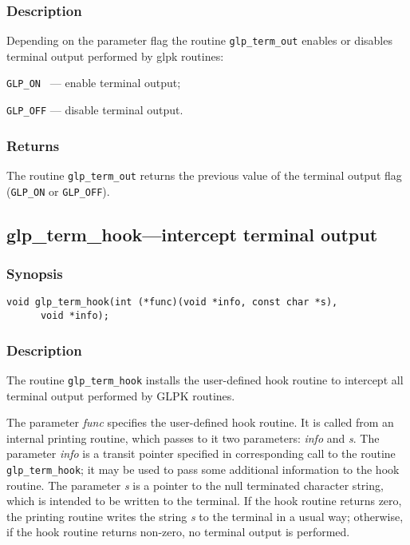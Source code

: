 \subsubsection*{Description}

Depending on the parameter flag the routine \verb|glp_term_out| enables
or disables terminal output performed by glpk routines:

\verb|GLP_ON | --- enable terminal output;

\verb|GLP_OFF| --- disable terminal output.

\subsubsection*{Returns}

The routine \verb|glp_term_out| returns the previous value of the
terminal output flag (\verb|GLP_ON| or \verb|GLP_OFF|).

\subsection{glp\_term\_hook---intercept terminal output}

\subsubsection*{Synopsis}

\begin{verbatim}
void glp_term_hook(int (*func)(void *info, const char *s),
      void *info);
\end{verbatim}

\subsubsection*{Description}

The routine \verb|glp_term_hook| installs the user-defined hook routine
to intercept all terminal output performed by GLPK routines.


The parameter {\it func} specifies the user-defined hook routine. It is
called from an internal printing routine, which passes to it two
parameters: {\it info} and {\it s}. The parameter {\it info} is a
transit pointer specified in corresponding call to the routine
\verb|glp_term_hook|; it may be used to pass some additional information
to the hook routine. The parameter {\it s} is a pointer to the null
terminated character string, which is intended to be written to the
terminal. If the hook routine returns zero, the printing routine writes
the string {\it s} to the terminal in a usual way; otherwise, if the
hook routine returns non-zero, no terminal output is performed.

